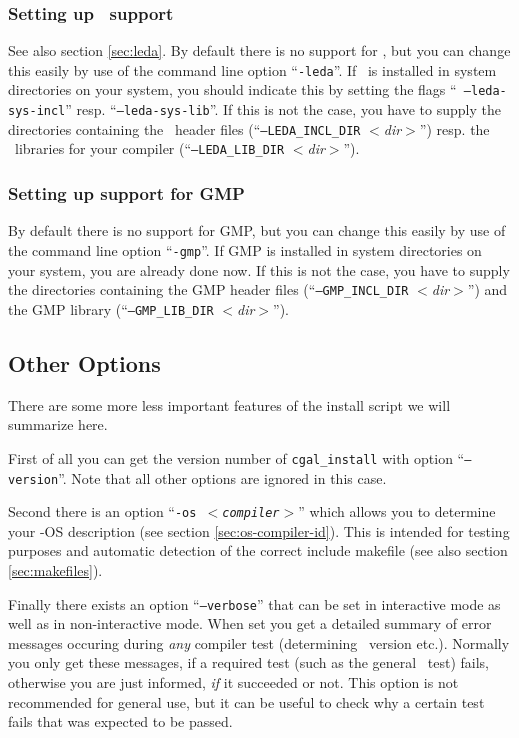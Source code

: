 \subsubsection{Setting up \leda\ support}\label{sec:leda-setup}

See also section \ref{sec:leda}. By default there is no support for
\leda, but you can change this easily by use of the command line
option ``{\tt -leda}''. If \leda\ is installed in system directories
on your system, you should indicate this by setting the flags ``{\tt
  --leda-sys-incl}'' resp.  ``{\tt --leda-sys-lib}''. If this is not
the case, you have to supply the directories containing the \leda\ 
header files (``{\tt --LEDA\_INCL\_DIR} {\it $<$dir$>$}'') resp. the
\leda\ libraries for your compiler (``{\tt --LEDA\_LIB\_DIR} {\it
  $<$dir$>$}'').

\subsubsection{Setting up support for GMP}\label{sec:gmp-setup}

By default there is no support for GMP, but you can change this easily
by use of the command line option ``{\tt -gmp}''. If GMP is installed
in system directories on your system, you are already done now. If
this is not the case, you have to supply the directories containing
the GMP header files (``{\tt --GMP\_INCL\_DIR} {\it $<$dir$>$}'') and
the GMP library (``{\tt --GMP\_LIB\_DIR} {\it $<$dir$>$}'').

\subsection{Other Options}\label{sec:other-options}

There are some more less important features of the install script
we will summarize here. 

First of all you can get the version number of {\tt cgal\_install}
with option ``{\tt --version}''. Note that all other options are
ignored in this case.

Second there is an option ``{\tt -os {\it $<$compiler$>$}}'' which
allows you to determine your \cgal-OS description (see section
\ref{sec:os-compiler-id}). This is intended for testing purposes and
automatic detection of the correct include makefile (see also section
\ref{sec:makefiles}).

Finally there exists an option ``{\tt --verbose}'' that can be set in
interactive mode as well as in non-interactive mode. When set you get
a detailed summary of error messages occuring during {\it any}
compiler test (determining \stl\ version etc.). Normally you only get
these messages, if a required test (such as the general \stl\ test)
fails, otherwise you are just informed, {\it if} it succeeded or not.
This option is not recommended for general use, but it can be useful
to check why a certain test fails that was expected to be passed.

